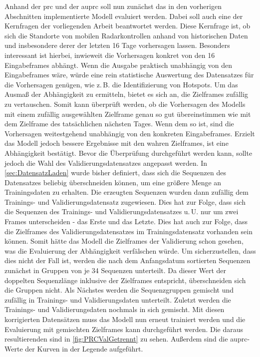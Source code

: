 Anhand der \acrshort{prc} und der \acrshort{auprc} soll nun zunächst das in den vorherigen Abschnitten implementierte Modell evaluiert werden.
Dabei soll auch eine der Kernfragen der vorliegenden Arbeit beantwortet werden.
Diese Kernfrage ist, ob sich die Standorte von mobilen Radarkontrollen anhand von historischen Daten und insbesondere derer der letzten 16 Tage vorhersagen lassen.
Besonders interessant ist hierbei, inwieweit die Vorhersagen konkret von den 16 Eingabeframes abhängt.
Wenn die Ausgabe praktisch unabhängig von den Eingabeframes wäre, würde eine rein statistische Auswertung des Datensatzes für die Vorhersagen genügen, wie z.\,B. die Identifizierung von Hotspots.
Um das Ausmaß der Abhängigkeit zu ermitteln, bietet es sich an, die Zielframes zufällig zu vertauschen.
Somit kann überprüft werden, ob die Vorhersagen des Modells mit einem zufällig ausgewählten Zielframe genau so gut übereinstimmen wie mit dem Zielframe des tatsächlichen nächsten Tages.
Wenn dem so ist, sind die Vorhersagen weitestgehend unabhängig von den konkreten Eingabeframes.
Erzielt das Modell jedoch bessere Ergebnisse mit den wahren Zielframes, ist eine Abhängigkeit bestätigt.
Bevor die Überprüfung durchgeführt werden kann, sollte jedoch die Wahl des Validierungsdatensatzes angepasst werden.
In \autoref{sec:DatensatzLaden} wurde bisher definiert, dass sich die Sequenzen des Datensatzes beliebig überschneiden können, um eine größere Menge an Trainingsdaten zu erhalten.
Die erzeugten Sequenzen wurden dann zufällig dem Trainings- und Validierungsdatensatz zugewiesen.
Dies hat zur Folge, dass sich die Sequenzen des Trainings- und Validierungsdatensatzes u.\,U. nur um zwei Frames unterscheiden - das Erste und das Letzte.
Dies hat auch zur Folge, dass die Zielframes des Validierungsdatensatzes im Trainingsdatensatz vorhanden sein können.
Somit hätte das Modell die Zielframes der Validierung schon gesehen, was die Evaluierung der Abhängigkeit verfälschen würde.
Um sicherzustellen, dass dies nicht der Fall ist, werden die nach dem Anfangsdatum sortierten Sequenzen zunächst in Gruppen von je 34 Sequenzen unterteilt.
Da dieser Wert der doppelten Sequenzlänge inklusive der Zielframes entspricht, überschneiden sich die Gruppen nicht.
Als Nächstes werden die Sequenzgruppen gemischt und zufällig in Trainings- und Validierungsdaten unterteilt.
Zuletzt werden die Trainings- und Validierungsdaten nochmals in sich gemischt.
Mit diesen korrigierten Datensätzen muss das Modell nun erneut trainiert werden und die Evaluierung mit gemischten Zielframes kann durchgeführt werden.
Die daraus resultierenden  sind in \autoref{fig:PRCValGetrennt} zu sehen.
Außerdem sind die \acrshort{auprc}-Werte der Kurven in der Legende aufgeführt.

